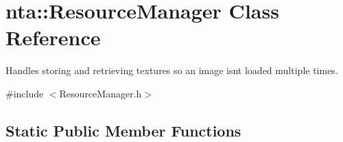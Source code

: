 \hypertarget{classnta_1_1ResourceManager}{}\section{nta\+:\+:Resource\+Manager Class Reference}
\label{classnta_1_1ResourceManager}


Handles storing and retrieving textures so an image isn\textquotesingle{}t loaded multiple times.  




{\ttfamily \#include $<$Resource\+Manager.\+h$>$}

\subsection*{Static Public Member Functions}
